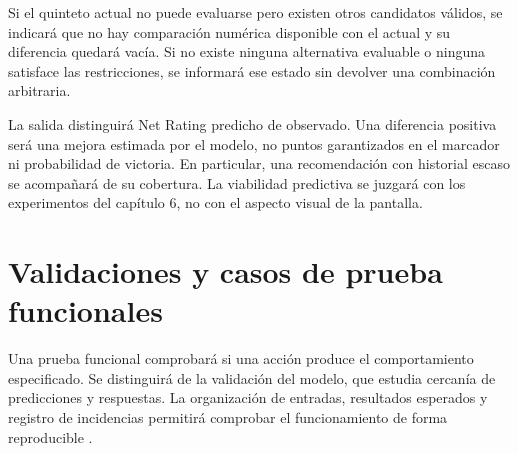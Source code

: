 Si el quinteto actual no puede evaluarse pero existen otros candidatos válidos, se indicará que no hay comparación numérica disponible con el actual y su diferencia quedará vacía. Si no existe ninguna alternativa evaluable o ninguna satisface las restricciones, se informará ese estado sin devolver una combinación arbitraria.

La salida distinguirá Net Rating predicho de observado. Una diferencia positiva será una mejora estimada por el modelo, no puntos garantizados en el marcador ni probabilidad de victoria. En particular, una recomendación con historial escaso se acompañará de su cobertura. La viabilidad predictiva se juzgará con los experimentos del capítulo 6, no con el aspecto visual de la pantalla.

\section{Validaciones y casos de prueba funcionales}
\label{sec:casos-prueba-demostrador}
Una prueba funcional comprobará si una acción produce el comportamiento especificado. Se distinguirá de la validación del modelo, que estudia cercanía de predicciones y respuestas. La organización de entradas, resultados esperados y registro de incidencias permitirá comprobar el funcionamiento de forma reproducible \cite{sommerville2016software}.


